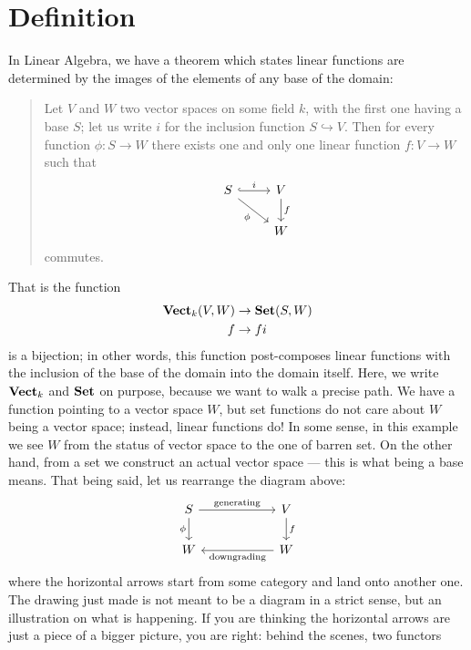 
\section{Definition}

\begin{example}
In Linear Algebra, we have a theorem which states linear functions are determined by the images of the elements of any base of the domain:
\begin{quotation}
Let \(V\) and \(W\) two vector spaces on some field \(k\), with the first one having a base \(S\); let us write \(i\) for the inclusion function \(S \hookrightarrow V\). Then for every function \(\phi : S \to W\) there exists one and only one linear function \(f : V \to W\) such that
\[\begin{tikzcd}
S \ar["i", r, hook] \ar["\phi", dr, swap] & V \ar["f", d] \\
& W
\end{tikzcd}\]
commutes.
\end{quotation}
That is the function
\begin{equation}\begin{aligned}
\mathbf{Vect}_k(V, W) &\to \mathbf{Set}(S, W) \\
f &\to fi
\end{aligned}\label{function:AdjBijSetVect}\end{equation}
is a bijection; in other words, this function post-composes linear functions with the inclusion of the base of the domain into the domain itself. Here, we write \(\mathbf{Vect}_k\) and \(\mathbf{Set}\) on purpose, because we want to walk a precise path. We have a function pointing to a vector space \(W\), but set functions do not care about \(W\) being a vector space; instead, linear functions do! In some sense, in this example we see \(W\)  from the status of vector space to the one of barren set. On the other hand, from a set we construct an actual vector space --- this is what being a base means. That being said, let us rearrange the diagram above:
\[\begin{tikzcd}[column sep=2cm]
S \ar["{\text{generating}}", r] \ar["\phi", d, swap] & V \ar["f", d] \\
W & W \ar["{\text{downgrading}}", l]
\end{tikzcd}\]
where the horizontal arrows start from some category and land onto another one. The drawing just made is not meant to be a diagram in a strict sense, but an illustration on what is happening. If you are thinking the horizontal arrows are just a piece of a bigger picture, you are right: behind the scenes, two functors

\end{example}
